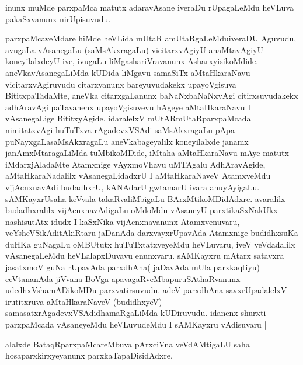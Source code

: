\begin{artha}
inunx muMde parxpaMca matutx adaravAsane iveraDu rUpagaLeMdu heVLuva
pakaSxvanunx nirUpisuvudu.
\end{artha}


\begin{center}

\end{center}

\begin{artha}
parxpaMcaveMdare hiMde heVLida mUtaR amUtaRgaLeMduiveraDU Aguvudu,
avugaLa vAsanegaLu (saMsAkxragaLu) vicitarxvAgiyU anaMtavAgiyU
koneyilalxdeyU ive, ivugaLu liMgashariVravanunx
AsharxyisikoMdide. aneVkavAsanegaLiMda kUDida liMgavu samaSiTx
aMtaHkaraNavu vicitarxvAgiruvudu citarxvanunx bareyuvudakekx
upayoVgisuva BititxpaTadaMte, aneVka citarxgaLanunx baNaNxbaNaNxvAgi
citirxsuvudakekx adhAravAgi paTavanenx upayoVgisuvevu hAgeye
aMtaHkaraNavu I vAsanegaLige BititxyAgide. idaralelxV
mUtARmUtaRparxpaMcada nimitatxvAgi huTuTxva rAgadevxVSAdi
saMsAkxragaLu pApa puNayxgaLasaMsAkxragaLu aneVkabageyalilx
koneyilalxde janamx janAmxMtaragaLiMda tuMbikoMDide, iMtaha
aMtaHkaraNavu mAye matutx iMdarxjAladaMte Atamxnige vAyxmoVhavu
uMTAgalu AdhAravAgide, aMtaHkaraNadalilx vAsanegaLidadxrU I
aMtaHkaraNaveV AtamxveMdu vijAcnxnavAdi budadhxrU, kANAdarU gwtamarU
ivara anuyAyigaLu. sAMKayxrUsaha keVvala takaRvaliMbigaLu
BArxMtikoMDidAdxre. avaralilx budadhxralilx vijAcnxnavAdigaLu oMdoMdu
vAsaneyU parxtikaSxNakUkx nashisutAtx idudx I kaSxNika vijAcnxnavanunx
Atamxvenuvaru, veYsheVSikAditAkiRtaru jaDanAda darxvayxrUpavAda
Atamxnige budidhxsuKa duHKa guNagaLu oMBUtutx huTuTxtatxveyeMdu
heVLuvaru, iveV veVdadalilx vAsanegaLeMdu heVLalapxDuvavu
enunxvaru. sAMKayxru mAtarx satavxra jasatxmoV guNa rUpavAda
parxdhAna( jaDavAda mUla parxkaqtiyu) ceVtananAda jiVvana BoVga
apavagaRveMbapuruSAthaRvanunx udedhxVshamADikoMDu
parxvatirsuvudu. adeV parxdhAna savxrUpadalelxV irutitxruva
aMtaHkaraNaveV (budidhxyeV) samasatxrAgadevxVSAdidhamaRgaLiMda
kUDiruvudu. idanenx shurxti parxpaMcada vAsaneyeMdu heVLuvudeMdu I
sAMKayxru vAdisuvaru |

alalxde BataqRparxpaMcareMbuva pArxciVna veVdAMtigaLU saha
hosaparxkirxyeyanunx parxkaTapaDisidAdxre.
\end{artha}


\begin{center}


\end{center}

